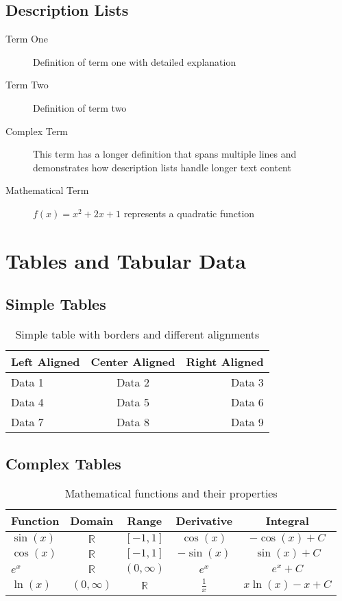 \documentclass[11pt,letterpaper]{article}
\begin{document}
\subsection{Description Lists}

\begin{description}
    \item[Term One] Definition of term one with detailed explanation
    \item[Term Two] Definition of term two
    \item[Complex Term] This term has a longer definition that spans multiple lines and demonstrates how description lists handle longer text content
    \item[Mathematical Term] $f(x) = x^2 + 2x + 1$ represents a quadratic function
\end{description}

\section{Tables and Tabular Data}

\subsection{Simple Tables}

\begin{table}[h]
\centering
\begin{tabular}{|l|c|r|}
\hline
Left Aligned & Center Aligned & Right Aligned \\
\hline
Data 1 & Data 2 & Data 3 \\
Data 4 & Data 5 & Data 6 \\
Data 7 & Data 8 & Data 9 \\
\hline
\end{tabular}
\caption{Simple table with borders and different alignments}
\label{tab:simple}
\end{table}

\subsection{Complex Tables}

\begin{table}[h]
\centering
\begin{tabular}{|l|c|c|c|c|}
\hline
\textbf{Function} & \textbf{Domain} & \textbf{Range} & \textbf{Derivative} & \textbf{Integral} \\
\hline
$\sin(x)$ & $\mathbb{R}$ & $[-1,1]$ & $\cos(x)$ & $-\cos(x) + C$ \\
\hline
$\cos(x)$ & $\mathbb{R}$ & $[-1,1]$ & $-\sin(x)$ & $\sin(x) + C$ \\
\hline
$e^x$ & $\mathbb{R}$ & $(0,\infty)$ & $e^x$ & $e^x + C$ \\
\hline
$\ln(x)$ & $(0,\infty)$ & $\mathbb{R}$ & $\frac{1}{x}$ & $x\ln(x) - x + C$ \\
\hline
\end{tabular}
\caption{Mathematical functions and their properties}
\label{tab:functions}
\end{table}
\end{document}
